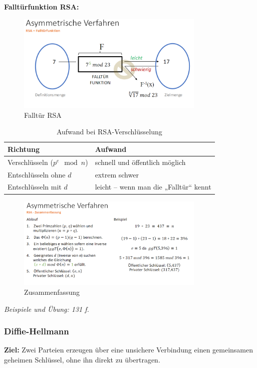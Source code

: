 \documentclass[a4paper,12pt]{article}
\begin{document}
\noindent\textbf{Falltürfunktion RSA:}
\begin{figure}[H]
    \centering
    \includegraphics[width=0.8\textwidth]{bilder/FalltürRSA.png}
    \caption{Falltür RSA}
    \label{fig:FalltürRSA}
\end{figure}

\begin{table}[h!]
    \centering
    \begin{tabular}{@{}ll@{}}
    \toprule
    \textbf{Richtung} & \textbf{Aufwand} \\
    \midrule
    Verschlüsseln ($p^e \mod n$) & schnell und öffentlich möglich \\
    Entschlüsseln ohne $d$ & extrem schwer \\
    Entschlüsseln mit $d$ & leicht – wenn man die „Falltür“ kennt \\
    \bottomrule
    \end{tabular}
    \caption{Aufwand bei RSA-Verschlüsselung}
    \end{table}

    \begin{figure}[H]
        \centering
        \includegraphics[width=0.8\textwidth]{bilder/rsazusammenfassung.png}
        \caption{Zusammenfassung}
        \label{fig:Zusammenfassung}
    \end{figure}
    \textit{Beispiele und Übung: 131 f. }
\subsubsection{Diffie-Hellmann}
\textbf{Ziel:} Zwei Parteien erzeugen über eine unsichere Verbindung einen gemeinsamen geheimen Schlüssel, ohne ihn direkt zu übertragen.
\end{document}

